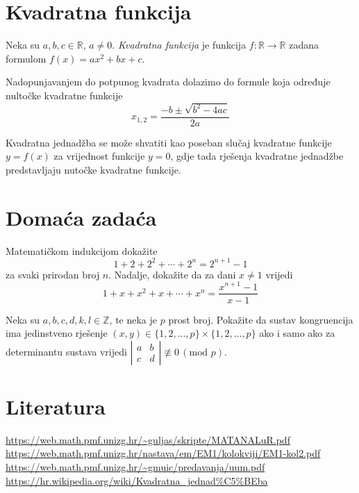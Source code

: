 \documentclass[10pt]{scrartcl}
\begin{document}
\section{Kvadratna funkcija}
\begin{definicija}
Neka su $a,b,c \in \mathbb R$, $a \neq 0$. \emph{Kvadratna funkcija} je funkcija $f \colon \mathbb R \to \mathbb R$ zadana formulom $f(x) = ax^2 + bx + c$. 
\end{definicija}
Nadopunjavanjem do potpunog kvadrata dolazimo do formule koja određuje nul\-to\-čke kvadratne funkcije
\begin{equation}
x_{1,2} = \frac{-b \pm \sqrt{b^2 - 4ac}}{2a}
\end{equation}
\begin{napomena}
Kvadratna jednadžba se može shvatiti kao poseban slučaj kvadratne funkcije $y = f(x)$ za vrijednost funkcije $y=0$, gdje tada rješenja kvadratne jednadžbe predstavljaju nutočke kvadratne funkcije. 
\end{napomena}
%
\section{Domaća zadaća}
\begin{zadatak}
Matematičkom indukcijom dokažite
\[
1+2+2^2+\dotsb+2^n = 2^{n+1} -1
\]
za svaki prirodan broj $n$. Nadalje, dokažite da za dani $x \neq 1$ vrijedi
\[
1+x+x^2+x+\dotsb+x^n = \frac{x^{n+1} -1}{x-1}
\]
\end{zadatak}
\begin{zadatak}
Neka su $a,b,c,d,k,l \in \mathbb Z$, te neka je $p$ prost broj. Pokažite da sustav kongruencija ima jedinstveno rješenje $(x,y)\in\{1,2,\dotsc,p\}\times\{1,2,\dotsc,p\}$ ako i samo ako za determinantu sustava vrijedi $\left|\begin{array}{cc} 
a & b \\ 
c & d 
\end{array}\right| \not \equiv 0\,(\text{mod } p)$.
\end{zadatak}
\section{Literatura}
\url{https://web.math.pmf.unizg.hr/~guljas/skripte/MATANALuR.pdf}\\
\url{https://web.math.pmf.unizg.hr/nastava/em/EM1/kolokviji/EM1-kol2.pdf}\\
\url{https://web.math.pmf.unizg.hr/~gmuic/predavanja/uum.pdf}\\
\url{https://hr.wikipedia.org/wiki/Kvadratna_jednad%C5%BEba}
\end{document}
